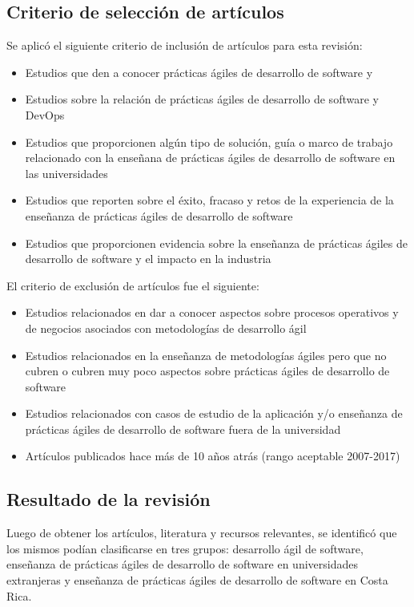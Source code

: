 \documentclass[journal]{IEEEtran}
\begin{document}
\subsection{Criterio de selección de artículos}
Se aplicó el siguiente criterio de inclusión de artículos para esta revisión:
\begin{itemize}
    \item Estudios que den a conocer prácticas ágiles de desarrollo de software y 
    \item Estudios sobre la relación de prácticas ágiles de desarrollo de software y DevOps 
    \item Estudios que proporcionen algún tipo de solución, guía o marco de trabajo relacionado con la enseñana de prácticas ágiles de desarrollo de software en las universidades
    \item Estudios que reporten sobre el éxito, fracaso y retos de la experiencia de la enseñanza de prácticas ágiles de desarrollo de software
    \item Estudios que proporcionen evidencia sobre la enseñanza de prácticas ágiles de desarrollo de software y el impacto en la industria
\end{itemize}

El criterio de exclusión de artículos fue el siguiente:
\begin{itemize}
    \item Estudios relacionados en dar a conocer aspectos sobre procesos operativos y de negocios asociados con metodologías de desarrollo ágil
    \item Estudios relacionados en la enseñanza de metodologías ágiles pero que no cubren o cubren muy poco aspectos sobre prácticas ágiles de desarrollo de software
    \item Estudios relacionados con casos de estudio de la aplicación y/o enseñanza de prácticas ágiles de desarrollo de software fuera de la universidad
    \item Artículos publicados hace más de 10 años atrás (rango aceptable 2007-2017)
\end{itemize}


\subsection{Resultado de la revisión} \label{sec:resultado-rev-lit}
Luego de obtener los artículos, literatura y recursos relevantes, se identificó que los mismos podían clasificarse en tres grupos: desarrollo ágil de software, enseñanza de prácticas ágiles de desarrollo de software en universidades extranjeras y enseñanza de prácticas ágiles de desarrollo de software en Costa Rica.
\end{document}
